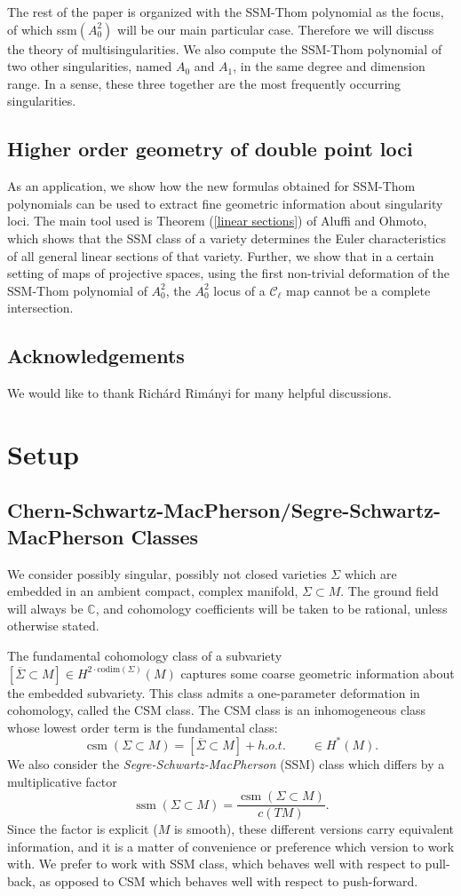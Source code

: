 \documentclass[11pt]{article}
\theoremstyle{plain}
\theoremstyle{definition}
\theoremstyle{definition}
\newcommand{\C}{\mathbb{C}}
\DeclareMathOperator{\csm}{csm}
\DeclareMathOperator{\ssm}{ssm}
\begin{document}
The rest of the paper is organized with the SSM-Thom polynomial as the focus, of which ssm$(A_0^2)$ will be our main particular case. Therefore we will discuss the theory of multisingularities. We also compute the SSM-Thom polynomial of two other singularities, named $A_0$ and $A_1$, in the same degree and dimension range. In a sense, these three together are the most frequently occurring singularities. 
 
\subsection{Higher order geometry of double point loci}
As an application, we show how the new formulas obtained for SSM-Thom polynomials can be used to extract fine geometric information about singularity loci. The main tool used is Theorem (\ref{linear sections}) of Aluffi and Ohmoto, which shows that the SSM class of a variety determines the Euler characteristics of all general linear sections of that variety. Further, we show that in a certain setting of maps of projective spaces, using the first non-trivial deformation of the SSM-Thom polynomial of $A_0^2$, the $A_0^2$ locus of a $\mathcal C_\ell$ map cannot be a complete intersection. 

\subsection{Acknowledgements}
We would like to thank Rich\'ard Rim\'anyi for many helpful discussions. 
\section{Setup}
\subsection{Chern-Schwartz-MacPherson/Segre-Schwartz-MacPherson Classes}\label{subsection:CSM-SSM-intro}

We consider possibly singular, possibly not closed varieties $\Sigma$ which are embedded in an ambient compact, complex manifold, $\Sigma \subset M$. The ground field will always be $\C$, and cohomology coefficients will be taken to be rational, unless otherwise stated.

The fundamental cohomology class of a subvariety $[\overline\Sigma\subset M]\in H^{2\cdot\text{codim}(\Sigma)}(M)$ captures some coarse geometric information about the embedded subvariety. This class admits a one-parameter deformation in cohomology, called the CSM class. The CSM class is an inhomogeneous class whose lowest order term is the fundamental class: 
\[
\csm(\Sigma\subset M) = [\overline{\Sigma}\subset M]+h.o.t. \quad \quad \in H^*(M).
\]
We also consider the \textit{Segre-Schwartz-MacPherson} (SSM) class which differs by a multiplicative factor
\[
\ssm(\Sigma\subset M) = \frac{\csm(\Sigma\subset M)}{c(TM)}.
\]
Since the factor is explicit ($M$ is smooth), these different versions carry equivalent information, and it is a matter of convenience or preference which version to work with. We prefer to work with SSM class, which behaves well with respect to pull-back, as opposed to CSM which behaves well with respect to push-forward. 
\end{document}
